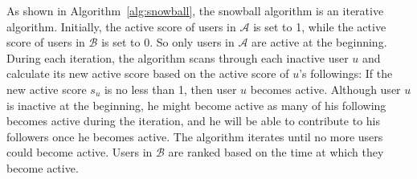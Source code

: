 \documentclass{article}
\begin{document}

As shown in Algorithm~\ref{alg:snowball}, the snowball algorithm is an iterative algorithm. Initially, the active score of users in $\mathcal{A}$ is set to 1, while the active score of users in $\mathcal{B}$ is set to 0. So only users in $\mathcal{A}$ are active at the beginning. During each iteration, the algorithm scans through each inactive user $u$ and calculate its new active score based on the active score of $u$'s followings:
If the new active score $s_u$ is no less than 1, then user $u$ becomes active. Although user $u$ is inactive at the beginning, he might become active as many of his following becomes active during the iteration, and he will be able to contribute to his followers once he becomes active. The algorithm iterates until no more users could become active. Users in $\mathcal{B}$ are ranked based on the time at which they become active.

\end{document}
